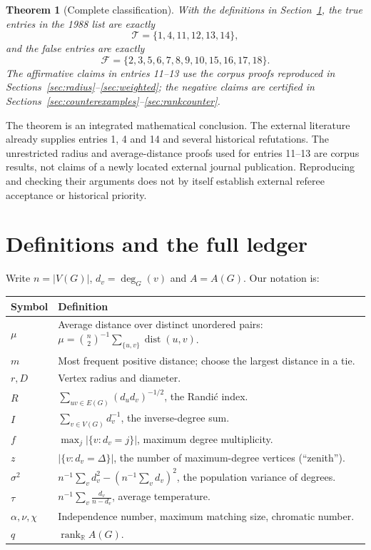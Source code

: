\documentclass[11pt,a4paper]{article}
\newtheorem{theorem}{Theorem}[section]
\theoremstyle{remark}\newtheorem{remark}[theorem]{Remark}
\DeclareMathOperator{\dist}{dist}
\DeclareMathOperator{\rank}{rank}
\begin{document}
\begin{theorem}[Complete classification]\label{thm:classification}
With the definitions in Section~\ref{sec:notation}, the true entries in the
1988 list are exactly
\[
 \mathcal T=\{1,4,11,12,13,14\},
\]
and the false entries are exactly
\[
 \mathcal F=\{2,3,5,6,7,8,9,10,15,16,17,18\}.
\]
The affirmative claims in entries 11--13 use the corpus proofs reproduced in
Sections~\ref{sec:radius}--\ref{sec:weighted}; the negative claims are certified
in Sections~\ref{sec:counterexamples}--\ref{sec:rankcounter}.
\end{theorem}

The theorem is an integrated mathematical conclusion. The external literature
already supplies entries 1, 4 and 14 and several historical refutations.
The unrestricted radius and average-distance proofs used for entries 11--13
are corpus results, not claims of a newly located external journal publication.
Reproducing and checking their arguments does not by itself establish external
referee acceptance or historical priority.

\clearpage
\section{Definitions and the full ledger}\label{sec:notation}
Write $n=|V(G)|$, $d_v=\deg_G(v)$ and $A=A(G)$. Our notation is:
\begin{center}\small
\begin{tabularx}{\linewidth}{@{}lX@{}}\toprule
Symbol & Definition\\\midrule
$\mu$ & Average distance over distinct unordered pairs:
$\displaystyle\mu=\binom n2^{-1}\sum_{\{u,v\}}\dist(u,v)$.\\
$m$ & Most frequent positive distance; choose the largest distance in a tie.\\
$r,D$ & Vertex radius and diameter.\\
$R$ & $\displaystyle\sum_{uv\in E(G)}(d_ud_v)^{-1/2}$, the Randi\'c index.\\
$I$ & $\displaystyle\sum_{v\in V(G)}d_v^{-1}$, the inverse-degree sum.\\
$f$ & $\displaystyle\max_j|\{v:d_v=j\}|$, maximum degree multiplicity.\\
$z$ & $|\{v:d_v=\Delta\}|$, the number of maximum-degree vertices (``zenith'').\\
$\sigma^2$ & $\displaystyle n^{-1}\sum_vd_v^2-(n^{-1}\sum_vd_v)^2$,
the population variance of degrees.\\
$\tau$ & $\displaystyle n^{-1}\sum_v\frac{d_v}{n-d_v}$, average temperature.\\
$\alpha,\nu,\chi$ & Independence number, maximum matching size, chromatic number.\\
$q$ & $\rank_{\mathbb R} A(G)$.\\\bottomrule
\end{tabularx}
\end{center}
\end{document}
